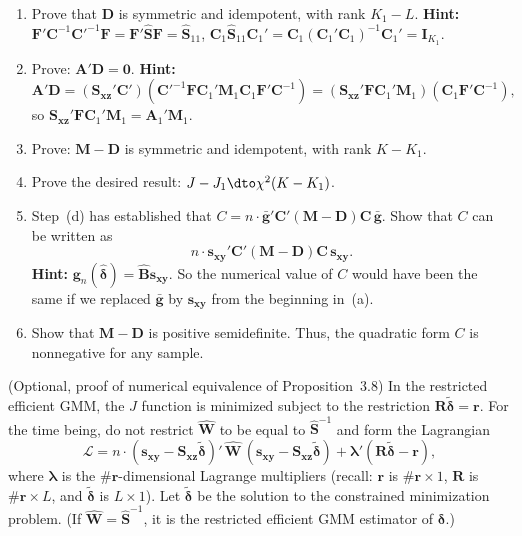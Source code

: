 \begin{problemset}
\begin{enumerate}[label=(\alph*)]
\item Prove that $\mathbf{D}$ is symmetric and idempotent, with rank $K_1 - L$.
  \textbf{Hint:}
  $\mathbf{F}'\mathbf{C}^{-1}\mathbf{C}'^{-1}\mathbf{F}
  = \mathbf{F}'\hat{\mathbf{S}}\mathbf{F} = \hat{\mathbf{S}}_{11}$,
  $\mathbf{C}_1 \hat{\mathbf{S}}_{11} \mathbf{C}_1'
  = \mathbf{C}_1(\mathbf{C}_1'\mathbf{C}_1)^{-1}\mathbf{C}_1' = \mathbf{I}_{K_1}$.

\item Prove: $\mathbf{A}'\mathbf{D} = \mathbf{0}$.  \textbf{Hint:}
  \[
    \mathbf{A}'\mathbf{D}
    = (\mathbf{S}_{\mathbf{xz}}'\mathbf{C}')
    (\mathbf{C}'^{-1}\mathbf{F}\mathbf{C}_1'\mathbf{M}_1
    \mathbf{C}_1\mathbf{F}'\mathbf{C}^{-1})
    = (\mathbf{S}_{\mathbf{xz}}'\mathbf{F}\mathbf{C}_1'\mathbf{M}_1)
    (\mathbf{C}_1\mathbf{F}'\mathbf{C}^{-1}),
  \]
  so $\mathbf{S}_{\mathbf{xz}}'\mathbf{F}\mathbf{C}_1'\mathbf{M}_1
  = \mathbf{A}_1'\mathbf{M}_1$.

\item Prove: $\mathbf{M} - \mathbf{D}$ is symmetric and idempotent, with rank $K - K_1$.

\item Prove the desired result: $J - J_1 \dto \chi^2(K - K_1)$.

\item Step~(d) has established that $C = n \cdot \bar{\mathbf{g}}'
  \mathbf{C}'(\mathbf{M} - \mathbf{D})\mathbf{C}\, \bar{\mathbf{g}}$.  Show that $C$ can be
  written as
  \[
    n \cdot \mathbf{s}_{\mathbf{xy}}' \mathbf{C}'(\mathbf{M} - \mathbf{D})
    \mathbf{C}\, \mathbf{s}_{\mathbf{xy}}.
  \]
  \textbf{Hint:} $\mathbf{g}_n(\hat{\boldsymbol{\delta}})
  = \hat{\mathbf{B}}\mathbf{s}_{\mathbf{xy}}$.  So the numerical value of $C$ would have been
  the same if we replaced $\bar{\mathbf{g}}$ by $\mathbf{s}_{\mathbf{xy}}$ from the beginning in~(a).

\item Show that $\mathbf{M} - \mathbf{D}$ is positive semidefinite.  Thus, the quadratic form $C$ is
  nonnegative for any sample.
\end{enumerate}

\exercise[8]
(Optional, proof of numerical equivalence of Proposition~3.8)  In the restricted
efficient GMM, the $J$ function is minimized subject to the restriction
$\mathbf{R}\tilde{\boldsymbol{\delta}} = \mathbf{r}$.  For the time being, do not restrict $\hat{\mathbf{W}}$
to be equal to $\hat{\mathbf{S}}^{-1}$ and form the Lagrangian
\[
  \mathcal{L} = n \cdot (\mathbf{s}_{\mathbf{xy}}
  - \mathbf{S}_{\mathbf{xz}} \tilde{\boldsymbol{\delta}})'\,
  \hat{\mathbf{W}}\,
  (\mathbf{s}_{\mathbf{xy}} - \mathbf{S}_{\mathbf{xz}} \tilde{\boldsymbol{\delta}})
  + \boldsymbol{\lambda}'(\mathbf{R}\tilde{\boldsymbol{\delta}} - \mathbf{r}),
\]
where $\boldsymbol{\lambda}$ is the $\#\mathbf{r}$-dimensional Lagrange multipliers (recall: $\mathbf{r}$
is $\#\mathbf{r} \times 1$, $\mathbf{R}$ is $\#\mathbf{r} \times L$, and $\tilde{\boldsymbol{\delta}}$
is $L \times 1$).  Let $\tilde{\boldsymbol{\delta}}$ be the solution to the constrained minimization
problem.  (If $\hat{\mathbf{W}} = \hat{\mathbf{S}}^{-1}$, it is the restricted efficient GMM estimator
of $\boldsymbol{\delta}$.)


\end{problemset}

